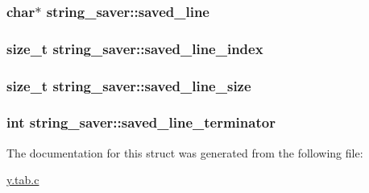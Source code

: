 \subsubsection[{\texorpdfstring{saved\+\_\+line}{saved_line}}]{\setlength{\rightskip}{0pt plus 5cm}char$\ast$ string\+\_\+saver\+::saved\+\_\+line}\hypertarget{structstring__saver_a8d76b634850f05cd2de7d3d9dfc489f1}{}\label{structstring__saver_a8d76b634850f05cd2de7d3d9dfc489f1}
\subsubsection[{\texorpdfstring{saved\+\_\+line\+\_\+index}{saved_line_index}}]{\setlength{\rightskip}{0pt plus 5cm}size\+\_\+t string\+\_\+saver\+::saved\+\_\+line\+\_\+index}\hypertarget{structstring__saver_aeabbc475d86ac4ab300b4b76bf2cbcc3}{}\label{structstring__saver_aeabbc475d86ac4ab300b4b76bf2cbcc3}
\subsubsection[{\texorpdfstring{saved\+\_\+line\+\_\+size}{saved_line_size}}]{\setlength{\rightskip}{0pt plus 5cm}size\+\_\+t string\+\_\+saver\+::saved\+\_\+line\+\_\+size}\hypertarget{structstring__saver_a86322652dc4c4f9aa6896304a41f8bf0}{}\label{structstring__saver_a86322652dc4c4f9aa6896304a41f8bf0}
\subsubsection[{\texorpdfstring{saved\+\_\+line\+\_\+terminator}{saved_line_terminator}}]{\setlength{\rightskip}{0pt plus 5cm}int string\+\_\+saver\+::saved\+\_\+line\+\_\+terminator}\hypertarget{structstring__saver_a905ce4a868ffb0d22b49216b8711f65e}{}\label{structstring__saver_a905ce4a868ffb0d22b49216b8711f65e}


The documentation for this struct was generated from the following file\+:\begin{DoxyCompactItemize}
\item 
\hyperlink{y_8tab_8c}{y.\+tab.\+c}\end{DoxyCompactItemize}

